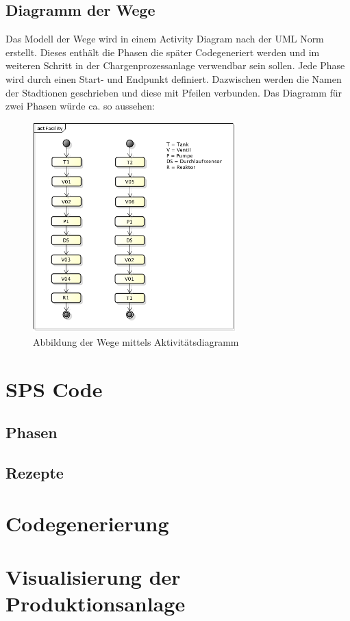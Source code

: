 \subsection{Diagramm der Wege}
Das Modell der Wege wird in einem Activity Diagram nach der UML Norm erstellt. Dieses enthält die Phasen die später Codegeneriert werden und im weiteren Schritt in der Chargenprozessanlage verwendbar sein sollen.
Jede Phase wird durch einen Start- und Endpunkt definiert. Dazwischen werden die Namen der Stadtionen geschrieben und diese mit Pfeilen verbunden. Das Diagramm für zwei Phasen würde ca. so aussehen: 
\begin{figure}[h!]
		\centering
		\includegraphics[width=0.7\textwidth]{graphics/konzept/UML_Activity.png}
		\caption{Abbildung der Wege mittels Aktivitätsdiagramm}
\end{figure}
\newpage
\section{SPS Code}
\subsection{Phasen}
\subsection{Rezepte}
\section{Codegenerierung}
\section{Visualisierung der Produktionsanlage}

